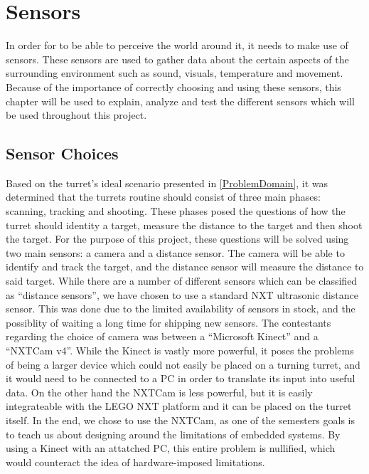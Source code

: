 \chapter{Sensors} \label{sensors}
In order for \name to be able to perceive the world around it, it needs to make
use of sensors. These sensors are used to gather data about the certain aspects
of the surrounding environment such as sound, visuals, temperature and
movement. Because of the importance of correctly choosing and using these
sensors, this chapter will be used to explain, analyze and test the different
sensors which will be used throughout this project.

\section{Sensor Choices}\label{SensorChoice}
Based on the turret's ideal scenario presented in \autoref{ProblemDomain}, it
was determined that the turrets routine should consist of three main phases:
scanning, tracking and shooting. These phases posed the questions of how the
turret should identity a target, measure the distance to the target and then shoot the
target. For the purpose of this project, these questions will be solved using
two main sensors: a camera and a distance sensor. The camera will be able to
identify and track the target, and the distance sensor will measure the
distance to said target. While there are a number of different sensors which
can be classified as ``distance sensors'', we have chosen to use a standard NXT
ultrasonic distance sensor. This was done due to the limited availability of
sensors in stock, and the possiblity of waiting a long time for shipping new
sensors. The contestants regarding the choice of camera was between a
``Microsoft Kinect'' and a ``NXTCam v4''. While the Kinect is vastly more
powerful, it poses the problems of being a larger device which could not easily
be placed on a turning turret, and it would need to be connected to a PC in
order to translate its input into useful data. On the other hand the NXTCam is less
powerful, but it is easily integrateable with the LEGO NXT platform and it can
be placed on the turret itself. In the end, we chose to use the NXTCam, as one
of the semesters goals is to teach us about designing around the limitations of
embedded systems. By using a Kinect with an attatched PC, this entire problem is
nullified, which would counteract the idea of hardware-imposed limitations.





% 
% 
% 
% 
